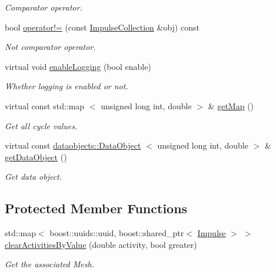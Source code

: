 \begin{DoxyCompactItemize}
\begin{DoxyCompactList}\small\item\em \-Comparator operator. \end{DoxyCompactList}\item 
bool \hyperlink{classcryomesh_1_1components_1_1ImpulseCollection_a64e8ed03f0ef6b33a0a94331bef08b05}{operator!=} (const \hyperlink{classcryomesh_1_1components_1_1ImpulseCollection}{\-Impulse\-Collection} \&obj) const 
\begin{DoxyCompactList}\small\item\em \-Not comparator operator. \end{DoxyCompactList}\item 
virtual void \hyperlink{classcryomesh_1_1dataobjects_1_1DataObjectController_a3e510413675407ec0a6745345ca9a3a8}{enable\-Logging} (bool enable)
\begin{DoxyCompactList}\small\item\em \-Whether logging is enabled or not. \end{DoxyCompactList}\item 
virtual const std\-::map\*
$<$ unsigned long int, double $>$ \& \hyperlink{classcryomesh_1_1dataobjects_1_1DataObjectController_a70a03ee28392ecf2e039702a18511f05}{get\-Map} ()
\begin{DoxyCompactList}\small\item\em \-Get all cycle values. \end{DoxyCompactList}\item 
virtual const \*
\hyperlink{classcryomesh_1_1dataobjects_1_1DataObject}{dataobjects\-::\-Data\-Object}\*
$<$ unsigned long int, double $>$ \& \hyperlink{classcryomesh_1_1dataobjects_1_1DataObjectController_aa919e8676a611028c6b6e6791c87f438}{get\-Data\-Object} ()
\begin{DoxyCompactList}\small\item\em \-Get data object. \end{DoxyCompactList}\end{DoxyCompactItemize}
\subsection*{\-Protected \-Member \-Functions}
\begin{DoxyCompactItemize}
\item 
std\-::map$<$ boost\-::uuids\-::uuid, \*
boost\-::shared\-\_\-ptr$<$ \hyperlink{classcryomesh_1_1components_1_1Impulse}{\-Impulse} $>$ $>$ \hyperlink{classcryomesh_1_1components_1_1ImpulseCollection_a3d5bac577752316e38d0d54715b85dca}{clear\-Activities\-By\-Value} (double activity, bool greater)
\begin{DoxyCompactList}\small\item\em \-Get the associated \-Mesh. \end{DoxyCompactList}\end{DoxyCompactItemize}
